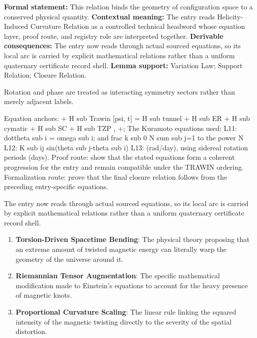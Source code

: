 \begingroup\footnotesize\setlength{\emergencystretch}{3em}\sloppy
\textbf{Formal statement:} This relation binds the geometry of configuration space to a conserved physical quantity. \textbf{Contextual meaning:} The entry reads Helicity-Induced Curvature Relation as a controlled technical headword whose equation layer, proof route, and registry role are interpreted together. \textbf{Derivable consequences:} The entry now reads through actual sourced equations, so its local arc is carried by explicit mathematical relations rather than a uniform quaternary certificate record shell. \textbf{Lemma support:} Variation Law; Support Relation; Closure Relation.\par
\endgroup

Rotation and phase are treated as interacting symmetry sectors rather than merely adjacent labels.

Equation anchors: + H sub Trawin [psi, t] = H sub tunnel + H sub ER + H sub cymatic + H sub SC + H sub TZP , +; The Kuramoto equations used: L11: dottheta sub i = omega sub i; and frac k sub 0 N sum sub j=1 to the power N L12: K sub ij sin(theta sub j-theta sub i) L13:   (rad/day), using sidereal rotation periods (days). Proof route: show that the stated equations form a coherent progression for the entry and remain compatible under the TRAWIN ordering. Formalization route: prove that the final closure relation follows from the preceding entry-specific equations.

The entry now reads through actual sourced equations, so its local arc is carried by explicit mathematical relations rather than a uniform quaternary certificate record shell.
\endgroup

\begin{enumerate}[leftmargin=1.6em,itemsep=6pt,topsep=4pt]
\item \textbf{Torsion-Driven Spacetime Bending}: The physical theory proposing that an extreme amount of twisted magnetic energy can literally warp the geometry of the universe around it.
\item \textbf{Riemannian Tensor Augmentation}: The specific mathematical modification made to Einstein's equations to account for the heavy presence of magnetic knots.
\item \textbf{Proportional Curvature Scaling}: The linear rule linking the squared intensity of the magnetic twisting directly to the severity of the spatial distortion.
\end{enumerate}

